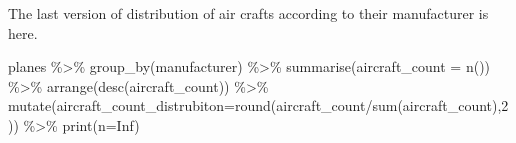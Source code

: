 \documentclass[
  letterpaper,
  DIV=11,
  numbers=noendperiod]{scrreprt}
\newenvironment{Shaded}{\begin{snugshade}}{\end{snugshade}}
\newcommand{\AttributeTok}[1]{\textcolor[rgb]{0.40,0.45,0.13}{#1}}
\newcommand{\ConstantTok}[1]{\textcolor[rgb]{0.56,0.35,0.01}{#1}}
\newcommand{\DecValTok}[1]{\textcolor[rgb]{0.68,0.00,0.00}{#1}}
\newcommand{\FunctionTok}[1]{\textcolor[rgb]{0.28,0.35,0.67}{#1}}
\newcommand{\NormalTok}[1]{\textcolor[rgb]{0.00,0.23,0.31}{#1}}
\newcommand{\SpecialCharTok}[1]{\textcolor[rgb]{0.37,0.37,0.37}{#1}}
\begin{document}
The last version of distribution of air crafts according to their
manufacturer is here.

\begin{Shaded}
\begin{Highlighting}[]
\NormalTok{planes }\SpecialCharTok{\%\textgreater{}\%} 
  \FunctionTok{group\_by}\NormalTok{(manufacturer) }\SpecialCharTok{\%\textgreater{}\%} 
  \FunctionTok{summarise}\NormalTok{(}\AttributeTok{aircraft\_count =} \FunctionTok{n}\NormalTok{()) }\SpecialCharTok{\%\textgreater{}\%} 
  \FunctionTok{arrange}\NormalTok{(}\FunctionTok{desc}\NormalTok{(aircraft\_count)) }\SpecialCharTok{\%\textgreater{}\%} 
  \FunctionTok{mutate}\NormalTok{(}\AttributeTok{aircraft\_count\_distrubiton=}\FunctionTok{round}\NormalTok{(aircraft\_count}\SpecialCharTok{/}\FunctionTok{sum}\NormalTok{(aircraft\_count),}\DecValTok{2}\NormalTok{)) }\SpecialCharTok{\%\textgreater{}\%} 
  \FunctionTok{print}\NormalTok{(}\AttributeTok{n=}\ConstantTok{Inf}\NormalTok{)}
\end{Highlighting}
\end{Shaded}
\end{document}
